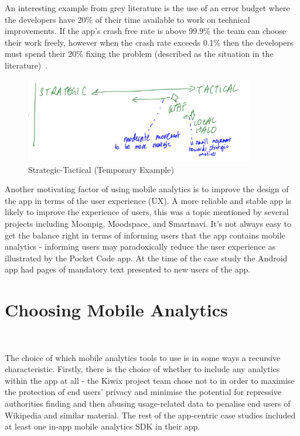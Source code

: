 An interesting example from grey literature is the use of an error budget where the developers have 20\% of their time available to work on technical improvements. If the app's crash free rate is above 99.9\% the team can choose their work freely, however when the crash rate exceeds 0.1\% then the developers must spend their 20\% fixing the problem (described as the situation in the literature)~\citep{koutun2021_how_to_deal_with_tech_debt_at_the_scale_of_super_app}.

\begin{figure}
    \centering
    \includegraphics[width=10cm]{images/rough-sketches/aiu-strategic-tactical-example.png}
    \caption{Strategic-Tactical (Temporary Example)}
    \label{fig:aiu-strategic-tactical-example}
\end{figure}



Another motivating factor of using mobile analytics is to improve the design of the app in terms of the user experience (UX). A more reliable and stable app is likely to improve the experience of users, this was a topic mentioned by several projects including Moonpig, Moodspace, and Smartnavi. It's not always easy to get the balance right in terms of informing users that the app contains mobile analytics - informing users may paradoxically reduce the user experience as illustrated by the Pocket Code app. At the time of the case study the Android app had pages of mandatory text presented to new users of the app.



\section{Choosing Mobile Analytics}~\label{aiu-choosing-mobile-analytics-section}

The choice of which mobile analytics tools to use is in some ways a recursive characteristic. Firstly, there is the choice of whether to include any analytics within the app at all - the Kiwix project team chose not to in order to maximise the protection of end users' privacy and minimise the potential for repressive authorities finding and then abusing usage-related data to penalise end users of Wikipedia and similar material. The rest of the app-centric case studies included at least one in-app mobile analytics SDK in their app.

